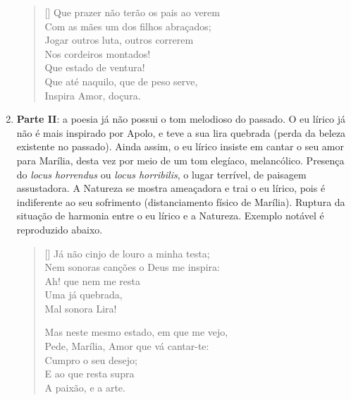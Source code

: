 \documentclass[12pt]{book}
\begin{document}
\begin{enumerate}
\begin{verse}[\versewidth]
						Que prazer não terão os pais ao verem \\
						Com as mães um dos filhos abraçados; \\
						Jogar outros luta, outros correrem \\
						\hspace{2em}Nos cordeiros montados! \\
						\hspace{2em}Que estado de ventura! \\
						Que até naquilo, que de peso serve, \\
						\hspace{2em}Inspira Amor, doçura. \\
					\end{verse}
					\item \textbf{Parte II}: a poesia já não possui o tom melodioso do passado. O eu lírico já não é mais inspirado por Apolo, e teve a sua lira quebrada (perda da beleza existente no passado). Ainda assim, o eu lírico insiste em cantar o seu amor para Marília, desta vez por meio de um tom elegíaco, melancólico. Presença do \textit{locus horrendus} ou \textit{locus horribilis}, o lugar terrível, de paisagem assustadora. A Natureza se mostra ameaçadora e trai o eu lírico, pois é indiferente ao seu sofrimento (distanciamento físico de Marília). Ruptura da situação de harmonia entre o eu lírico e a Natureza. Exemplo notável é reproduzido abaixo.
					\settowidth{\versewidth}{Nem sonoras canções o Deus me inspira:}
					\begin{verse}[\versewidth]
						Já não cinjo de louro a minha testa; \\
						Nem sonoras canções o Deus me inspira: \\
						\hspace{2em} Ah! que nem me resta \\
						\hspace{2em} Uma já quebrada, \\
						\hspace{2em} Mal sonora Lira!
						
						Mas neste mesmo estado, em que me vejo, \\
						Pede, Marília, Amor que vá cantar-te: \\
						\hspace{2em} Cumpro o seu desejo; \\
						\hspace{2em} E ao que resta supra \\
						\hspace{2em} A paixão, e a arte.
						

\end{verse}
\end{enumerate}
\end{document}
